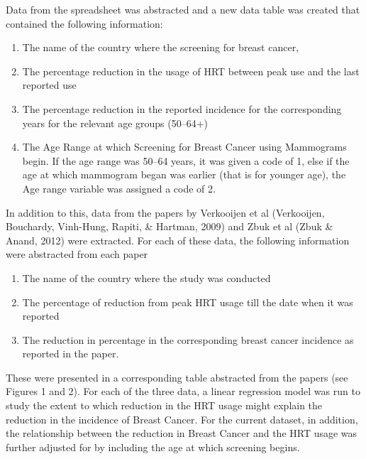 \documentclass{article}
\begin{document}
Data from the spreadsheet was abstracted and a new data table was created that contained the following information:

\begin{enumerate}
\item The name of the country where the screening for breast cancer,

\item The percentage reduction in the usage of HRT between peak use and the last reported use

\item The percentage reduction in the reported incidence for the corresponding years for the relevant age groups (50--64+)

\item The Age Range at which Screening for Breast Cancer using Mammograms begin. If the age range was 50--64 years, it was given a code of 1, else if the age at which mammogram began was earlier (that is for younger age), the Age range variable was assigned a code of 2.

\end{enumerate}

In addition to this, data from the papers by Verkooijen et al (Verkooijen, Bouchardy, Vinh-Hung, Rapiti, \& Hartman, 2009) and Zbuk et al (Zbuk \& Anand, 2012) were extracted. For each of these data, the following information were abstracted from each paper

\begin{enumerate}
\item The name of the country where the study was conducted

\item The percentage of reduction from peak HRT usage till the date when it was reported

\item The reduction in percentage in the corresponding breast cancer incidence as reported in the paper.

\end{enumerate}

These were presented in a corresponding table abstracted from the papers (see Figures 1 and 2). For each of the three data, a linear regression model was run to study the extent to which reduction in the HRT usage might explain the reduction in the incidence of Breast Cancer. For the current dataset, in addition, the relationship between the reduction in Breast Cancer and the HRT usage was further adjusted for by including the age at which screening begins. 
\end{document}

